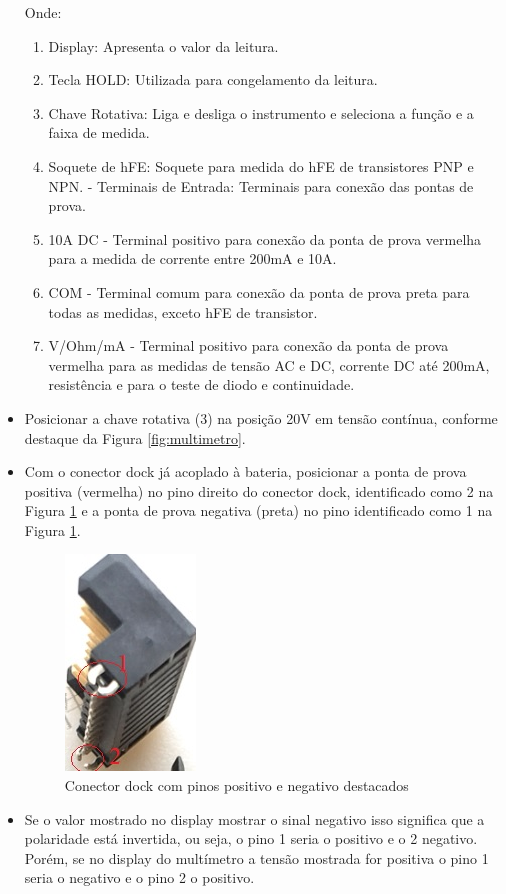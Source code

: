 \begin{itemize}
\par Onde: 

\begin{enumerate}
    \item Display: Apresenta o valor da leitura.
    \item Tecla HOLD: Utilizada para congelamento da leitura.
    \item Chave Rotativa: Liga e desliga o instrumento e seleciona a função e a faixa de medida. 
    \item Soquete de hFE: Soquete para medida do hFE de transistores PNP e NPN. - Terminais de Entrada: Terminais para conexão das pontas de prova. 
    \item 10A DC - Terminal positivo para conexão da ponta de prova vermelha para a medida de corrente entre 200mA e 10A. 
    \item COM - Terminal comum para conexão da ponta de prova preta para todas as medidas, exceto hFE de transistor.
    \item V/Ohm/mA - Terminal positivo para conexão da ponta de prova vermelha para as medidas de tensão AC e DC, corrente DC até 200mA, resistência e para o teste de diodo e continuidade.
\end{enumerate}

\item Posicionar a chave rotativa (3) na posição 20V em tensão contínua, conforme destaque da Figura \ref{fig:multimetro}. 

\item Com o conector dock já acoplado à bateria, posicionar a ponta de prova positiva (vermelha) no pino direito do conector dock, identificado como 2 na Figura \ref{fig:dock} e a ponta de prova negativa (preta) no pino identificado como 1 na Figura \ref{fig:dock}.

\begin{figure}[H]
  \centering
  \includegraphics[keepaspectratio=true,scale=1] {Figuras/MALETA/energiamaleta/dock.jpg}
  \caption{Conector dock com pinos positivo e negativo destacados} 
  \label{fig:dock}
\end{figure}

    \item Se o valor mostrado no display mostrar o sinal negativo isso significa que a polaridade está invertida, ou seja, o pino 1 seria o positivo e o 2 negativo. Porém, se no display do multímetro a tensão mostrada for positiva o pino 1 seria o negativo e o pino 2 o positivo.

\end{itemize}

